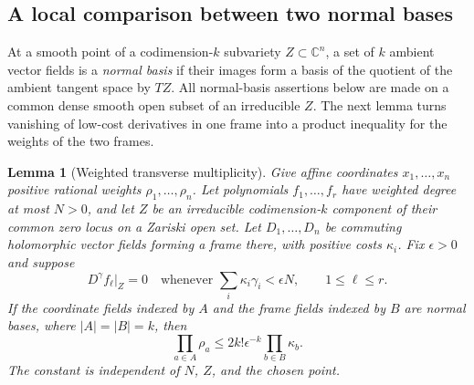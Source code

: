 \documentclass[11pt]{article}
\newtheorem{lemma}[theorem]{Lemma}
\theoremstyle{definition}
\theoremstyle{remark}
\newcommand{\C}{\mathbb C}
\numberwithin{equation}{section}
\begin{document}
\subsection{A local comparison between two normal bases}
At a smooth point of a codimension-\(k\) subvariety \(Z\subset\C^n\),
a set of \(k\) ambient vector fields is a \emph{normal basis} if their
images form a basis of the quotient of the ambient tangent space by
\(T Z\). All normal-basis assertions below are made on a common dense
smooth open subset of an irreducible \(Z\). The next lemma turns
vanishing of low-cost derivatives in one frame into a product inequality
for the weights of the two frames.

\begin{lemma}[Weighted transverse multiplicity]\label{lem:multiplicity}
Give affine coordinates \(x_1,\ldots,x_n\) positive rational weights
\(\rho_1,\ldots,\rho_n\). Let polynomials \(f_1,\ldots,f_r\) have
weighted degree at most \(N>0\), and let \(Z\) be an irreducible
codimension-\(k\) component of their common zero locus on a Zariski
open set. Let \(D_1,\ldots,D_n\) be commuting holomorphic vector
fields forming a frame there, with positive costs \(\kappa_i\).
Fix \(\epsilon>0\) and suppose
\[
 D^\gamma f_\ell|_Z=0
 \quad\text{whenever }\sum_i\kappa_i\gamma_i<\epsilon N,
 \qquad 1\le\ell\le r.
\]
If the coordinate fields indexed by \(A\) and the frame fields
indexed by \(B\) are normal bases, where \(|A|=|B|=k\), then
\begin{equation}\label{eq:multiplicity}
 \prod_{a\in A}\rho_a
 \le 2k!\epsilon^{-k}\prod_{b\in B}\kappa_b.
\end{equation}
The constant is independent of \(N\), \(Z\), and the chosen point.
\end{lemma}
\end{document}
